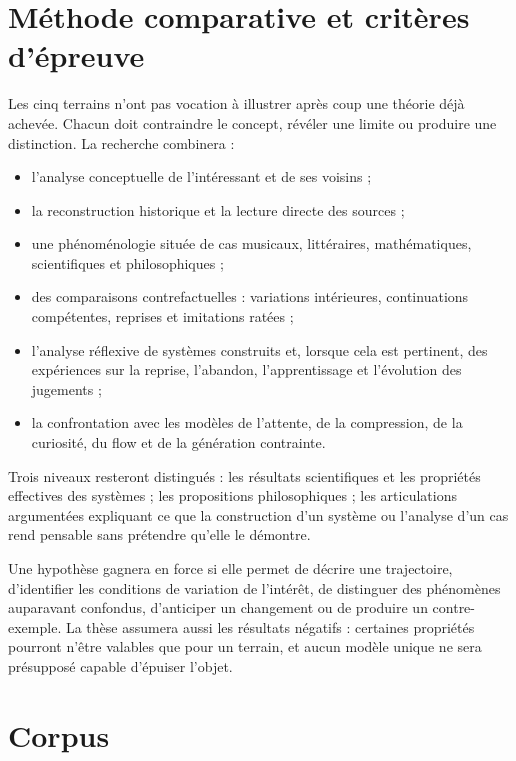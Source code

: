 \documentclass[11pt,a4paper]{article}
\begin{document}
\section{Méthode comparative et critères d'épreuve}

Les cinq terrains n'ont pas vocation à illustrer après coup une théorie déjà
achevée. Chacun doit contraindre le concept, révéler une limite ou produire une
distinction. La recherche combinera :

\begin{itemize}
  \item l'analyse conceptuelle de l'intéressant et de ses voisins ;
  \item la reconstruction historique et la lecture directe des sources ;
  \item une phénoménologie située de cas musicaux, littéraires, mathématiques,
        scientifiques et philosophiques ;
  \item des comparaisons contrefactuelles : variations intérieures,
        continuations compétentes, reprises et imitations ratées ;
  \item l'analyse réflexive de systèmes construits et, lorsque cela est
        pertinent, des expériences sur la reprise, l'abandon, l'apprentissage
        et l'évolution des jugements ;
  \item la confrontation avec les modèles de l'attente, de la compression, de
        la curiosité, du flow et de la génération contrainte.
\end{itemize}

Trois niveaux resteront distingués : les résultats scientifiques et les
propriétés effectives des systèmes ; les propositions philosophiques ; les
articulations argumentées expliquant ce que la construction d'un système ou
l'analyse d'un cas rend pensable sans prétendre qu'elle le démontre.

Une hypothèse gagnera en force si elle permet de décrire une trajectoire,
d'identifier les conditions de variation de l'intérêt, de distinguer des
phénomènes auparavant confondus, d'anticiper un changement ou de produire un
contre-exemple. La thèse assumera aussi les résultats négatifs : certaines
propriétés pourront n'être valables que pour un terrain, et aucun modèle unique
ne sera présupposé capable d'épuiser l'objet.

\section{Corpus}
\end{document}
